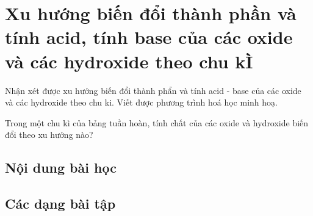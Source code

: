 \setcounter{section}{2}
\section[Xu hướng biến đổi tính acid, base]{Xu hướng biến đổi thành phần và tính acid, tính base của các oxide và các hydroxide \newline theo chu kÌ}
\vspace{1.25cm}
\begin{Muctieu}
	Nhận xét được xu hướng biến đổi thành phẩn và tính acid - base của các oxide và các hydroxide theo chu ki. Viết được phương trình hoá học minh hoạ.
\end{Muctieu}
\begin{kd}
	Trong một chu kì của bảng tuần hoàn, tính chất của các oxide và hydroxide biến đổi theo xu hướng nào?
\end{kd}
\subsection{Nội dung bài học}

\subsection{Các dạng bài tập}


